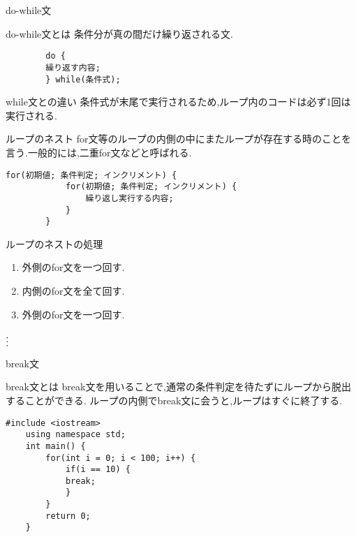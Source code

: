 \documentclass[xdvipdfmx, 8pt, t]{beamer}
\begin{document}
\begin{frame}[fragile]{do-while文}
    \begin{block}{do-while文とは}
        条件分が真の間だけ繰り返される文.
    \end{block}
    \begin{lstlisting}
        do {
        繰り返す内容;
        } while(条件式);
    \end{lstlisting}
    \begin{block}{while文との違い}
        条件式が末尾で実行されるため,ループ内のコードは必ず1回は実行される.
    \end{block}
\end{frame}

\begin{frame}[fragile]{ループのネスト}
    for文等のループの内側の中にまたループが存在する時のことを言う.一般的には,二重for文などと呼ばれる.
    \begin{lstlisting}[caption=二重for文]
        for(初期値; 条件判定; インクリメント) {
            for(初期値; 条件判定; インクリメント) {
                繰り返し実行する内容;
            }
        }
    \end{lstlisting}
    \begin{block}{ループのネストの処理}
        \begin{enumerate}
            \item 外側のfor文を一つ回す.
            \item 内側のfor文を全て回す.
            \item 外側のfor文を一つ回す.
        \end{enumerate}
        \centering
        $\textbf{\vdots}$
    \end{block}
\end{frame}

\begin{frame}[fragile]{break文}
    \begin{block}{break文とは}
        break文を用いることで,通常の条件判定を待たずにループから脱出することができる.
        ループの内側でbreak文に会うと,ループはすぐに終了する.
    \end{block}
    \small
    \begin{lstlisting}[caption = break.cpp]
    #include <iostream>
    using namespace std;
    int main() {
        for(int i = 0; i < 100; i++) {
            if(i == 10) {
            break;
            }
        }
        return 0;
    }
    \end{lstlisting}
\end{frame}
\end{document}
